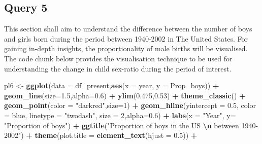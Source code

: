 \documentclass[11pt,a4paper,]{article}
\newenvironment{Shaded}{\begin{snugshade}}{\end{snugshade}}
\newcommand{\AttributeTok}[1]{\textcolor[rgb]{0.13,0.29,0.53}{#1}}
\newcommand{\DecValTok}[1]{\textcolor[rgb]{0.00,0.00,0.81}{#1}}
\newcommand{\FloatTok}[1]{\textcolor[rgb]{0.00,0.00,0.81}{#1}}
\newcommand{\FunctionTok}[1]{\textcolor[rgb]{0.13,0.29,0.53}{\textbf{#1}}}
\newcommand{\NormalTok}[1]{#1}
\newcommand{\OtherTok}[1]{\textcolor[rgb]{0.56,0.35,0.01}{#1}}
\newcommand{\SpecialCharTok}[1]{\textcolor[rgb]{0.81,0.36,0.00}{\textbf{#1}}}
\newcommand{\StringTok}[1]{\textcolor[rgb]{0.31,0.60,0.02}{#1}}
\begin{document}
\normalsize

\hypertarget{query-5}{%
\subsection{Query 5}\label{query-5}}

This section shall aim to understand the difference between the number of boys and girls born during the period between 1940-2002 in The United States. For gaining in-depth insights, the proportionality of male births will be visualised. The code chunk below provides the visualisation technique to be used for understanding the change in child sex-ratio during the period of interest.

\tiny

\begin{Shaded}
\begin{Highlighting}[]
\NormalTok{pl6 }\OtherTok{\textless{}{-}} \FunctionTok{ggplot}\NormalTok{(}\AttributeTok{data =}\NormalTok{ df\_present,}\FunctionTok{aes}\NormalTok{(}\AttributeTok{x =}\NormalTok{ year, }\AttributeTok{y =}\NormalTok{ Prop\_boys)) }\SpecialCharTok{+} 
  \FunctionTok{geom\_line}\NormalTok{(}\AttributeTok{size=}\FloatTok{1.5}\NormalTok{,}\AttributeTok{alpha=}\FloatTok{0.6}\NormalTok{) }\SpecialCharTok{+} \FunctionTok{ylim}\NormalTok{(}\FloatTok{0.475}\NormalTok{,}\FloatTok{0.53}\NormalTok{) }\SpecialCharTok{+} \FunctionTok{theme\_classic}\NormalTok{() }\SpecialCharTok{+} \FunctionTok{geom\_point}\NormalTok{(}\AttributeTok{color =} \StringTok{"darkred"}\NormalTok{,}\AttributeTok{size=}\DecValTok{1}\NormalTok{) }\SpecialCharTok{+}
  \FunctionTok{geom\_hline}\NormalTok{(}\AttributeTok{yintercept =} \FloatTok{0.5}\NormalTok{,}
             \AttributeTok{color =} \StringTok{\textquotesingle{}blue\textquotesingle{}}\NormalTok{,}
             \AttributeTok{linetype =} \StringTok{"twodash"}\NormalTok{,}
             \AttributeTok{size =} \DecValTok{2}\NormalTok{,}\AttributeTok{alpha=}\FloatTok{0.6}\NormalTok{) }\SpecialCharTok{+} \FunctionTok{labs}\NormalTok{(}\AttributeTok{x =} \StringTok{"Year"}\NormalTok{, }\AttributeTok{y=} \StringTok{"Proportion of boys"}\NormalTok{) }\SpecialCharTok{+} 
  \FunctionTok{ggtitle}\NormalTok{(}\StringTok{"Proportion of boys in the US }\SpecialCharTok{\textbackslash{}n}\StringTok{ between 1940{-}2002"}\NormalTok{) }\SpecialCharTok{+} 
  \FunctionTok{theme}\NormalTok{(}\AttributeTok{plot.title =} \FunctionTok{element\_text}\NormalTok{(}\AttributeTok{hjust =} \FloatTok{0.5}\NormalTok{)) }\SpecialCharTok{+}
  

\end{Highlighting}
\end{Shaded}
\end{document}
